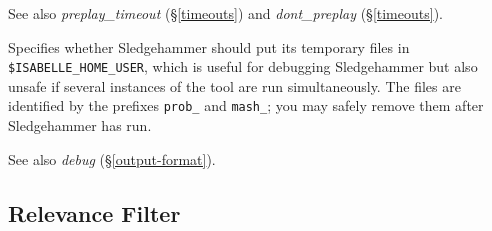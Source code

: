 \documentclass[a4paper,12pt]{article}
\begin{document}
\begin{enum}
\nopagebreak
{\small See also \textit{preplay\_timeout} (\S\ref{timeouts})
and \textit{dont\_preplay} (\S\ref{timeouts}).}

Specifies whether Sledgehammer should put its temporary files in
\texttt{\$ISA\-BELLE\_\allowbreak HOME\_\allowbreak USER}, which is useful for
debugging Sledgehammer but also unsafe if several instances of the tool are run
simultaneously. The files are identified by the prefixes \texttt{prob\_} and
\texttt{mash\_}; you may safely remove them after Sledgehammer has run.

\nopagebreak
{\small See also \textit{debug} (\S\ref{output-format}).}
\end{enum}

\subsection{Relevance Filter}
\label{relevance-filter}
\end{document}
